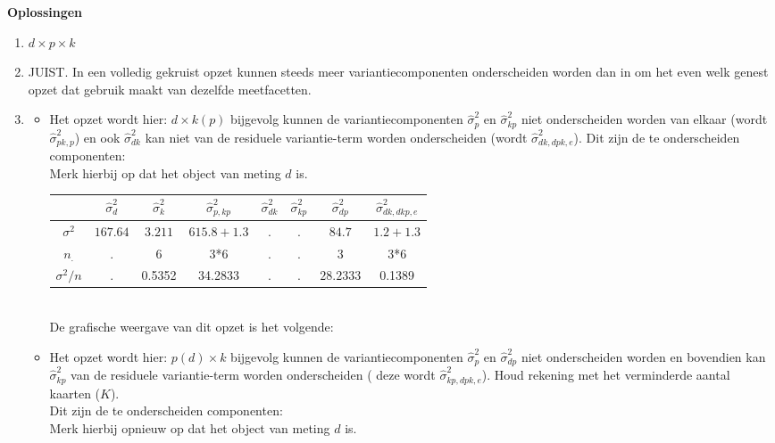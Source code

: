 \OPLOSSING
{
\textbf{Oplossingen}
\begin{enumerate}
\item $d \times p \times k$

\item JUIST. In een volledig gekruist opzet kunnen steeds meer variantiecomponenten onderscheiden worden dan in om het even welk genest opzet dat gebruik maakt van dezelfde meetfacetten. 
\item
\begin{itemize}
	\item Het opzet wordt hier: $d \times k\left(p\right)$ bijgevolg kunnen de variantiecomponenten $\hat{\sigma}^2_p$ en $\hat{\sigma}^2_{kp}$ niet onderscheiden worden van elkaar (wordt $\hat{\sigma}^2_{pk,p}$) en ook $\hat{\sigma}^2_{dk}$ kan niet van de residuele variantie-term worden onderscheiden (wordt $\hat{\sigma}^2_{dk, dpk,e}$). Dit zijn de te onderscheiden componenten:\\ Merk hierbij op dat het object van meting $d$ is. \\
	\begin{tabular}{|c|c|c|c|c|c|c|c|} \hline
	 & $ \hat{\sigma}^2_{d}$ & $ \hat{\sigma}^2_{k} $& $ \hat{\sigma}^2_{p,kp} $ & $ \hat{\sigma}^2_{dk}$ & $\hat{\sigma}^2_{kp} $ & $ \hat{\sigma}^2_{dp} $& $ \hat{\sigma}^2_{dk, dkp, e} $ \\ \hline
	$\sigma^2$  			& $ 167.64 $ 			& $ 3.211 $ 			& $615.8+1.3  $ 			& $ .$				 & $. $	& $ 84.7 $	 & $ 1.2 + 1.3  $ \\
	$n_.$				& .						& 6						& 3*6				 		& $ .$		  		 & $. $	& $ 3 $		 &  3*6 \\ \hline
	$\sigma^2 / n$ 		& .						& 0.5352				& 34.2833				 	& $ .$			  	 & $. $	& $ 28.2333 $& 0.1389 \\ \hline
	\end{tabular} \\
	De grafische weergave van dit opzet is het volgende:\\
	
	
	\item Het opzet wordt hier: $p(d) \times k$ bijgevolg kunnen de variantiecomponenten $\hat{\sigma}^2_p$ en $\hat{\sigma}^2_{dp}$ niet onderscheiden worden en bovendien kan $\hat{\sigma}^2_{kp}$ van de residuele variantie-term worden onderscheiden ( deze wordt $\hat{\sigma}^2_{kp, dpk, e}$). Houd rekening met het verminderde aantal kaarten ($K$).\\Dit zijn de te onderscheiden componenten:\\ Merk hierbij opnieuw op dat het object van meting $d$ is. \\


\end{itemize}
\end{enumerate}}
